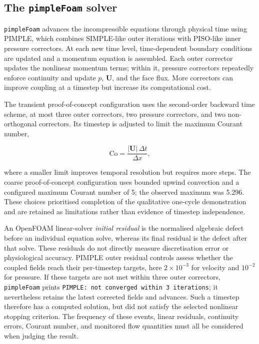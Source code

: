 \documentclass[11pt,a4paper]{article}
\begin{document}
\subsection{The \texttt{pimpleFoam} solver}

\texttt{pimpleFoam} advances the incompressible equations through physical time
using PIMPLE, which combines SIMPLE-like outer iterations with PISO-like inner
pressure correctors. At each new time level, time-dependent boundary conditions
are updated and a momentum equation is assembled. Each outer corrector updates
the nonlinear momentum terms; within it, pressure correctors repeatedly enforce
continuity and update $p$, $\mathbf{U}$, and the face flux. More correctors can
improve coupling at a timestep but increase its computational cost.

The transient proof-of-concept configuration uses the second-order backward time
scheme, at most three outer correctors, two pressure correctors, and two
non-orthogonal correctors. Its timestep is adjusted to limit the maximum Courant
number,

\begin{equation}
  \mathrm{Co}=\frac{|\mathbf{U}|\,\Delta t}{\Delta x},
\end{equation}

where a smaller limit improves temporal resolution but requires more steps. The
coarse proof-of-concept configuration uses bounded upwind convection and a
configured maximum Courant number of 5; the observed maximum was 5.296. These
choices prioritised completion of the qualitative one-cycle demonstration and
are retained as limitations rather than evidence of timestep independence.

An OpenFOAM linear-solver \emph{initial residual} is the normalised algebraic
defect before an individual equation solve, whereas its final residual is the
defect after that solve. These residuals do not directly measure discretisation
error or physiological accuracy. PIMPLE outer residual controls assess whether
the coupled fields reach their per-timestep targets, here
$2\times10^{-3}$ for velocity and $10^{-2}$ for pressure. If these targets are
not met within three outer correctors, \texttt{pimpleFoam} prints
\texttt{PIMPLE: not converged within 3 iterations}; it nevertheless retains the
latest corrected fields and advances. Such a timestep therefore has a computed
solution, but did not satisfy the selected nonlinear stopping criterion. The
frequency of these events, linear residuals, continuity errors, Courant number,
and monitored flow quantities must all be considered when judging the result.
\end{document}
